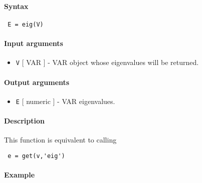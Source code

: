 


	\paragraph{Syntax}
 
 \begin{verbatim}
 E = eig(V)
 \end{verbatim}
 
 \paragraph{Input arguments}
 
 \begin{itemize}
 \item
   \texttt{V} {[} VAR {]} - VAR object whose eigenvalues will be
   returned.
 \end{itemize}
 
 \paragraph{Output arguments}
 
 \begin{itemize}
 \item
   \texttt{E} {[} numeric {]} - VAR eigenvalues.
 \end{itemize}
 
 \paragraph{Description}
 
 This function is equivalent to calling
 
 \begin{verbatim}
 e = get(v,'eig')
 \end{verbatim}
 
 \paragraph{Example}


